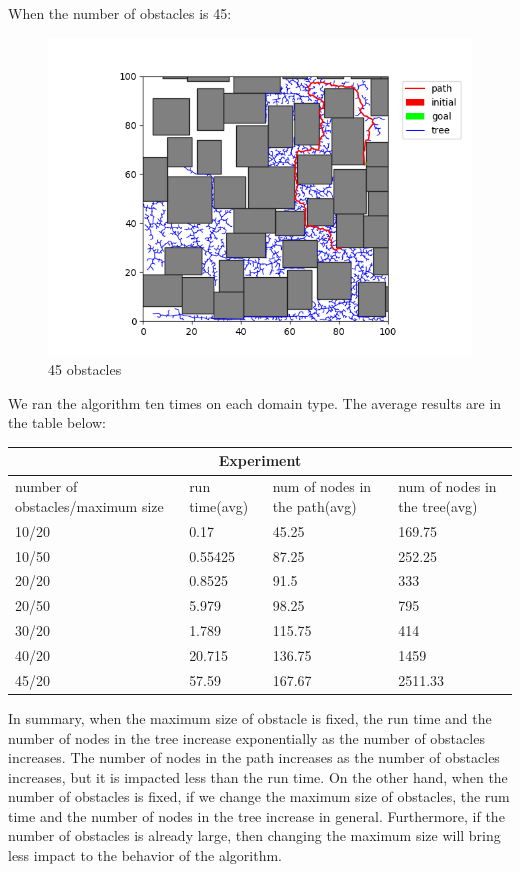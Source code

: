 \documentclass[12pt,a4paper]{article}
\begin{document}
When the number of obstacles is 45:
\begin{figure}[H]
\centering

\includegraphics[scale=.45]{45_2.png}
\caption{45 obstacles}
\end{figure}


We ran the algorithm ten times on each domain type. The average results are in the table below:\\
\begin{center}
\begin{tabular}{ |p{3cm}||p{3cm}|p{3cm}|p{3cm}|  }

 \hline
 \multicolumn{4}{|c|}{Experiment} \\
 \hline
 number of obstacles/maximum size& run time(avg) & num of nodes in the path(avg) & num of nodes in the tree(avg)\\
 \hline
 10/20   & 0.17    &45.25&   169.75\\
 10/50&   0.55425  & 87.25   &252.25\\
 20/20 &0.8525 & 91.5 &  333\\
 20/50    &5.979 & 98.25&  795\\
 30/20&  1.789  & 115.75 &414\\
 40/20& 20.715  & 136.75   &1459\\
 45/20& 57.59  & 167.67 &2511.33\\
 \hline
\end{tabular}
\end{center}

In summary, when the maximum size of obstacle is fixed, the run time and the number of nodes in the tree increase exponentially as the number of obstacles increases. The number of nodes in the path increases as the number of obstacles increases, but it is impacted less than the run time. On the other hand, when the number of obstacles is fixed, if we change the maximum size of obstacles, the rum time and the number of nodes in the tree increase in general.
Furthermore, if the number of obstacles is already large, then changing the maximum size will bring less impact to the behavior of the algorithm.
\end{document}
